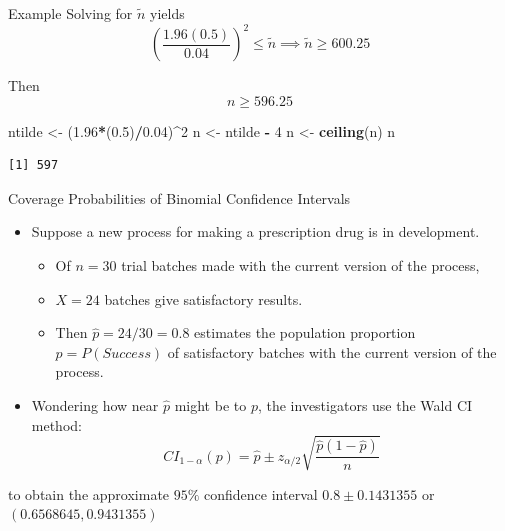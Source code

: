 \documentclass[
  ignorenonframetext,
]{beamer}
\newenvironment{Shaded}{\begin{snugshade}}{\end{snugshade}}
\newcommand{\DecValTok}[1]{\textcolor[rgb]{0.00,0.00,0.81}{#1}}
\newcommand{\FloatTok}[1]{\textcolor[rgb]{0.00,0.00,0.81}{#1}}
\newcommand{\FunctionTok}[1]{\textcolor[rgb]{0.13,0.29,0.53}{\textbf{#1}}}
\newcommand{\NormalTok}[1]{#1}
\newcommand{\OtherTok}[1]{\textcolor[rgb]{0.56,0.35,0.01}{#1}}
\newcommand{\SpecialCharTok}[1]{\textcolor[rgb]{0.81,0.36,0.00}{\textbf{#1}}}
\providecommand{\tightlist}{%
  \setlength{\itemsep}{0pt}\setlength{\parskip}{0pt}}
\begin{document}
\begin{frame}[fragile]{Example}
\protect\hypertarget{example-4}{}
Solving for \(\tilde{n}\) yields
\[\left(\frac{1.96(0.5)}{0.04}\right)^2\leq \tilde{n} \implies \tilde{n}\geq 600.25\]

Then \[n\geq 596.25\] \tiny

\begin{Shaded}
\begin{Highlighting}[]
\NormalTok{ntilde }\OtherTok{\textless{}{-}}\NormalTok{ (}\FloatTok{1.96}\SpecialCharTok{*}\NormalTok{(}\FloatTok{0.5}\NormalTok{)}\SpecialCharTok{/}\FloatTok{0.04}\NormalTok{)}\SpecialCharTok{\^{}}\DecValTok{2}
\NormalTok{n }\OtherTok{\textless{}{-}}\NormalTok{ ntilde }\SpecialCharTok{{-}} \DecValTok{4}
\NormalTok{n }\OtherTok{\textless{}{-}} \FunctionTok{ceiling}\NormalTok{(n)}
\NormalTok{n}
\end{Highlighting}
\end{Shaded}

\begin{verbatim}
[1] 597
\end{verbatim}

\normalsize
\end{frame}

\begin{frame}{Coverage Probabilities of Binomial Confidence Intervals}
\protect\hypertarget{coverage-probabilities-of-binomial-confidence-intervals}{}
\begin{itemize}
\item
  Suppose a new process for making a prescription drug is in
  development.

  \begin{itemize}
  \tightlist
  \item
    Of \(n=30\) trial batches made with the current version of the
    process,
  \item
    \(X=24\) batches give satisfactory results.
  \item
    Then \(\hat{p}=24/30=0.8\) estimates the population proportion
    \(p=P(Success)\) of satisfactory batches with the current version of
    the process.
  \end{itemize}
\item
  Wondering how near \(\hat{p}\) might be to \(p\), the investigators
  use the Wald CI method:
  \[CI_{1 - \alpha}(p) =\hat{p}\pm z_{\alpha/2}\sqrt{\frac{\hat{p}(1-\hat{p})}{n}}\]
\end{itemize}

to obtain the approximate \(95\%\) confidence interval
\(0.8 \pm 0.1431355\) or \((0.6568645, 0.9431355)\)
\end{frame}
\end{document}
